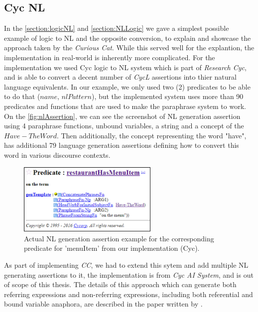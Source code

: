 \subsection{Cyc NL}
\label{section:cycnl}
In the \autoref{section:logicNL} and \autoref{section:NLLogic} we gave a 
simplest possible 
example of logic to NL and the opposite conversion, to explain and showcase the
approach taken by the \emph{Curious Cat}. While this served well for the
explantion, the implementation in real-world is inherently more complicated.
For the implementation we used Cyc logic to NL system which is part of 
\emph{Research Cyc}\autocite{Coppock2010,Baxter2005}, and is able to convert
a decent number of \emph{CycL} assertions into thier natural language 
equivalents. In our example, we only used two (2) predicates to be able to
do that ($name$, $nlPattern$), but the implemented system uses more than
90 predicates and functions that are used to make the paraphrase system to work.
On the \autoref{fig:nlAssertion}, we can see the screenshot of
NL generation assertion using 4 paraphrase functions, unbound variables,
a string and a concept of the $Have-TheWord$. Then additionally, the concept
representing the word "have", has additional 79 language generation assertions
defining how to convert this word in various discourse contexts. 

\begin{figure}[h]
	\centering
		\includegraphics[width=0.6\textwidth]{figures/nlAssertion.png}
	\caption{Actual NL generation assertion example for the corresponding predicate for 'menuItem' from our implementation (Cyc).}
	\label{fig:nlAssertion}
\end{figure}

As part of implementing \emph{CC}, we had
to extend this sytem and add multiple NL generating assertions to it, the
implementation is from \emph{Cyc AI System}, and is out of scope of this 
thesis. The details of this approach which can generate both referring 
expressions and non-referring expressions, including both referential and 
bound variable anaphora, are described in the paper written by
\textcite{Coppock2010}. 

